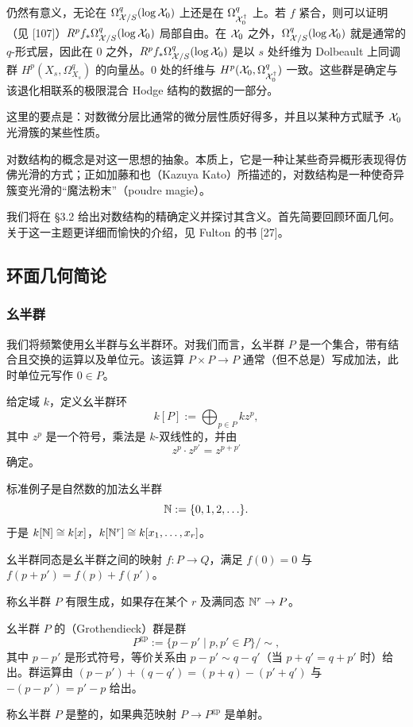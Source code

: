 仍然有意义，无论在 $\Omega^q_{\mathcal{X}/S}(\log \mathcal{X}_0)$ 上还是在 $\Omega^q_{\mathcal{X}_0^\dagger}$ 上。若 $f$ 紧合，则可以证明（见 [107]）$R^pf_*\Omega^q_{\mathcal{X}/S}(\log \mathcal{X}_0)$ 局部自由。在 $\mathcal{X}_0$ 之外，$\Omega^q_{\mathcal{X}/S}(\log \mathcal{X}_0)$ 就是通常的 $q$-形式层，因此在 $0$ 之外，$R^pf_*\Omega^q_{\mathcal{X}/S}(\log \mathcal{X}_0)$ 是以 $s$ 处纤维为 Dolbeault 上同调群 $H^p(X_s,\Omega^q_{X_s})$ 的向量丛。$0$ 处的纤维与 $H^p(\mathcal{X}_0,\Omega^q_{\mathcal{X}_0^\dagger})$ 一致。这些群是确定与该退化相联系的极限混合 Hodge 结构的数据的一部分。

这里的要点是：对数微分层比通常的微分层性质好得多，并且以某种方式赋予 $\mathcal{X}_0$ 光滑簇的某些性质。

对数结构的概念是对这一思想的抽象。本质上，它是一种让某些奇异概形表现得仿佛光滑的方式；正如加藤和也（Kazuya Kato）所描述的，对数结构是一种使奇异簇变光滑的“魔法粉末”（poudre magie）。

我们将在 §3.2 给出对数结构的精确定义并探讨其含义。首先简要回顾环面几何。关于这一主题更详细而愉快的介绍，见 Fulton 的书 [27]。

\subsection{环面几何简论}

\subsubsection{幺半群}

我们将频繁使用幺半群与幺半群环。对我们而言，幺半群 $P$ 是一个集合，带有结合且交换的运算以及单位元。该运算 $P\times P\to P$ 通常（但不总是）写成加法，此时单位元写作 $0\in P$。

给定域 $k$，定义幺半群环
\[
  k[P]:=\bigoplus_{p\in P}kz^p,
\]
其中 $z^p$ 是一个符号，乘法是 $k$-双线性的，并由
\[
  z^p\cdot z^{p'}=z^{p+p'}
\]
确定。

标准例子是自然数的加法幺半群
\[
  \mathbb{N}:=\{0,1,2,\ldots\}.
\]
于是 $k[\mathbb{N}]\cong k[x]$，$k[\mathbb{N}^r]\cong k[x_1,\ldots,x_r]$。

幺半群同态是幺半群之间的映射 $f:P\to Q$，满足 $f(0)=0$ 与 $f(p+p')=f(p)+f(p')$。

称幺半群 $P$ 有限生成，如果存在某个 $r$ 及满同态 $\mathbb{N}^r\to P$。

幺半群 $P$ 的（Grothendieck）群是群
\[
  P^{\mathrm{gp}}:=\{p-p'\mid p,p'\in P\}/\sim,
\]
其中 $p-p'$ 是形式符号，等价关系由 $p-p'\sim q-q'$（当 $p+q'=q+p'$ 时）给出。群运算由 $(p-p')+(q-q')=(p+q)-(p'+q')$ 与 $-(p-p')=p'-p$ 给出。

称幺半群 $P$ 是整的，如果典范映射 $P\to P^{\mathrm{gp}}$ 是单射。

